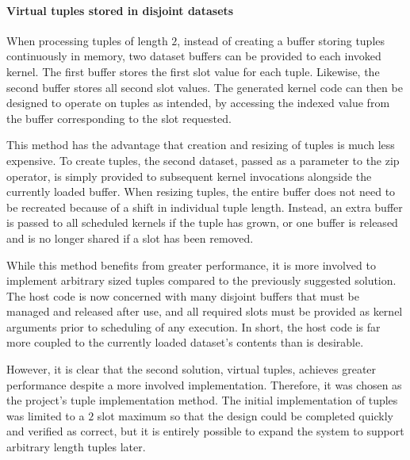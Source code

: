 \paragraph*{Virtual tuples stored in disjoint datasets}
When processing tuples of length $2$, instead of creating a buffer storing tuples continuously in memory, two dataset buffers can be provided to each invoked kernel. The first buffer stores the first slot value for each tuple. Likewise, the second buffer stores all second slot values. The generated kernel code can then be designed to operate on tuples as intended, by accessing the indexed value from the buffer corresponding to the slot requested.

This method has the advantage that creation and resizing of tuples is much less expensive. To create tuples, the second dataset, passed as a parameter to the zip operator, is simply provided to subsequent kernel invocations alongside the currently loaded buffer. When resizing tuples, the entire buffer does not need to be recreated because of a shift in individual tuple length. Instead, an extra buffer is passed to all scheduled kernels if the tuple has grown, or one buffer is released and is no longer shared if a slot has been removed.

While this method benefits from greater performance, it is more involved to implement arbitrary sized tuples compared to the previously suggested solution. The host code is now concerned with many disjoint buffers that must be managed and released after use, and all required slots must be provided as kernel arguments prior to scheduling of any execution. In short, the host code is far more coupled to the currently loaded dataset's contents than is desirable.

However, it is clear that the second solution, virtual tuples, achieves greater performance despite a more involved implementation. Therefore, it was chosen as the project's tuple implementation method. The initial implementation of tuples was limited to a $2$ slot maximum so that the design could be completed quickly and verified as correct, but it is entirely possible to expand the system to support arbitrary length tuples later.
